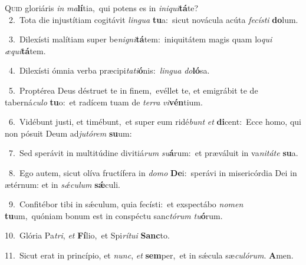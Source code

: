 \lettrine{\initial\textcolor{\initialcolor}{Q}}{uid} gloriáris \textit{in} \textit{ma}\-\textbf{lí}tia,~\star qui potens es in \textit{in}\-\textit{i}\textit{qui}\textbf{tá}te?\\
{\numbfont\textcolor{\numbcolor}{~2.}}~Tota die injustítiam cogitávit \textit{lin}\-\textit{gua} \textbf{tu}\-a:~\star sicut novácula acúta \textit{fe}\-\textit{cís}\textit{ti} \textbf{do}\-lum.\par
{\numbfont\textcolor{\numbcolor}{~3.}}~Dilexísti malítiam super be\-\textit{ni}\-\textit{gni}\textbf{tá}tem:~\star iniquitátem magis quam lo\textit{qui} \textit{æ}\-\textit{qui}\textbf{tá}tem.\par
{\numbfont\textcolor{\numbcolor}{~4.}}~Dilexísti ómnia verba præcipi\-\textit{ta}\-\textit{ti}\textbf{ó}nis:~\star \textit{lin}\-\textit{gua} \textit{do}\-\textbf{ló}sa.\par
{\numbfont\textcolor{\numbcolor}{~5.}}~Proptérea Deus déstruet te in finem,~\dagger evéllet te, et emigrábit te de taberná\-\textit{cu}\-\textit{lo} \textbf{tu}\-o:~\star et radícem tuam de \textit{ter}\-\textit{ra} \textit{vi}\-\textbf{vén}tium.\par
{\numbfont\textcolor{\numbcolor}{~6.}}~Vidébunt justi, et timébunt,~\dagger et super eum ridé\textit{bunt} \textit{et} \textbf{di}\-cent:~\star Ecce homo, qui non pósuit Deum ad\-\textit{ju}\-\textit{tó}\textit{rem} \textbf{su}\-um:\par
{\numbfont\textcolor{\numbcolor}{~7.}}~Sed sperávit in multitúdine divitiá\textit{rum} \textit{su}\-\textbf{á}rum:~\star et præváluit in va\-\textit{ni}\-\textit{tá}\textit{te} \textbf{su}\-a.\par
{\numbfont\textcolor{\numbcolor}{~8.}}~Ego autem, sicut olíva fructífera in \textit{do}\-\textit{mo} \textbf{De}\-i:~\star sperávi in misericórdia Dei in ætérnum: et in \textit{sǽ}\-\textit{cu}\textit{lum} \textbf{sǽ}\-culi.\par
{\numbfont\textcolor{\numbcolor}{~9.}}~Confitébor tibi in sǽculum, quia fecísti:~\dagger et exspectábo \textit{no}\-\textit{men} \textbf{tu}\-um,~\star quóniam bonum est in conspéctu sanc\-\textit{tó}\-\textit{rum} \textit{tu}\-\textbf{ó}rum.\par
{\numbfont\textcolor{\numbcolor}{10.}}~Glória Pa\-\textit{tri}\-, \textit{et} \textbf{Fí}\-lio,~\star et Spi\-\textit{rí}\-\textit{tu}\textit{i} \textbf{Sanc}\-to.\par
{\numbfont\textcolor{\numbcolor}{11.}}~Sicut erat in princípio, et \textit{nunc}\-, \textit{et} \textbf{sem}\-per,~\star et in sǽcula sæ\-\textit{cu}\-\textit{ló}\textit{rum}. \textbf{A}\-men.\par
